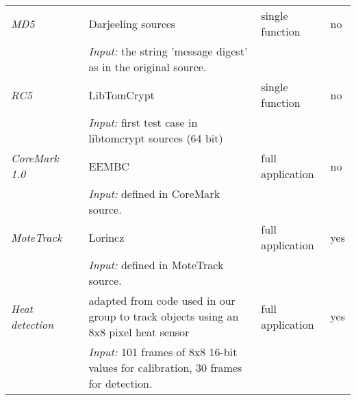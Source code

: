 \begin{table}[h]
\begin{tabular}{llp{}ll}
\emph{MD5}               & \cite{Brouwers:2009cj, Ellul:2012thesis} & Darjeeling sources                                                                                         & single function  & no \\
                         &                                          & \emph{Input:} the string 'message digest' as in the original source.                                       &                  & \\ %

\emph{RC5}               &                                          & LibTomCrypt \cite{libtomcrypt}                                                                             & single function  & no \\
                         &                                          & \emph{Input:} first test case in libtomcrypt sources (64 bit)                                              &                  & \\

\emph{CoreMark 1.0}      &                                          & EEMBC \cite{coremark}                                                                                      & full application & no \\
                         &                                          & \emph{Input:} defined in CoreMark source.                                                                  &                  & \\

\emph{MoteTrack}         &                                          & Lorincz \cite{Lorincz:2006fc, motetrack}                                                                   & full application & yes \\
                         &                                          & \emph{Input:} defined in MoteTrack source.                                                                 &                  & \\

\emph{Heat detection}    &                                          & adapted from code used in our group to track objects using an 8x8 pixel heat sensor                        & full application & yes \\
                         &                                          & \emph{Input:} 101 frames of 8x8 16-bit values for calibration, 30 frames for detection.                    &                  & \\


\end{tabular}
\end{table}
